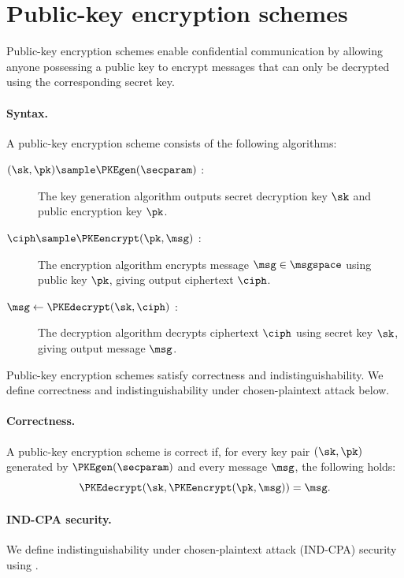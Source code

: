 \section{Public-key encryption schemes}\label{sec:prelims-encryption}

Public-key encryption schemes enable confidential communication by allowing
anyone possessing a public key to encrypt messages that can only be decrypted
using the corresponding secret key.

\paragraph{Syntax.} A public-key encryption scheme consists of the following
algorithms:

\begin{description}

  \item[$(\sk, \pk) \sample \PKEgen(\secparam)$ : ] The key generation algorithm
outputs secret decryption key $\sk$ and public encryption key $\pk$.

  \item[$\ciph \sample \PKEencrypt(\pk, \msg)$ : ] The encryption algorithm
encrypts message $\msg \in \msgspace$ using public key $\pk$, giving output
ciphertext
$\ciph$.

  \item[$\msg \leftarrow \PKEdecrypt(\sk, \ciph)$ : ] The decryption algorithm
decrypts ciphertext $\ciph$ using secret key $\sk$, giving output message
$\msg$.

\end{description}

Public-key encryption schemes satisfy correctness and indistinguishability. We
define correctness and indistinguishability under chosen-plaintext attack
below.

\paragraph{Correctness.} A public-key encryption scheme is correct if, for every
key pair $(\sk,\pk)$ generated by $\PKEgen(\secparam)$ and every message $\msg$,
the following holds:
%
\begin{equation*}
%
  \PKEdecrypt(\sk, \PKEencrypt(\pk, \msg)) = \msg.
%
\end{equation*}
%
\paragraph{IND-CPA security.} We define indistinguishability under
chosen-plaintext attack (IND-CPA) security using .

